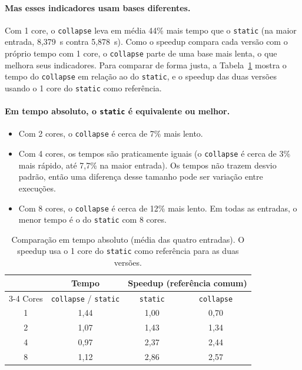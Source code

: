 \documentclass[a4paper,12pt]{article}
\begin{document}
\paragraph{Mas esses indicadores usam bases diferentes.} Com 1 core, o
\texttt{collapse} leva em média 44\% mais tempo que o \texttt{static} (na maior
entrada, 8,379~s contra 5,878~s). Como o speedup compara cada versão com o
próprio tempo com 1 core, o \texttt{collapse} parte de uma base mais lenta, o
que melhora seus indicadores. Para comparar de forma justa, a
Tabela~\ref{tab:comum} mostra o tempo do \texttt{collapse} em relação ao do
\texttt{static}, e o speedup das duas versões usando o 1 core do
\texttt{static} como referência.

\paragraph{Em tempo absoluto, o \texttt{static} é equivalente ou melhor.}
\begin{itemize}
    \item Com 2 cores, o \texttt{collapse} é cerca de 7\% mais lento.
    \item Com 4 cores, os tempos são praticamente iguais (o \texttt{collapse} é
    cerca de 3\% mais rápido, até 7,7\% na maior entrada). Os tempos não trazem
    desvio padrão, então uma diferença desse tamanho pode ser variação entre
    execuções.
    \item Com 8 cores, o \texttt{collapse} é cerca de 12\% mais lento. Em todas
    as entradas, o menor tempo é o do \texttt{static} com 8 cores.
\end{itemize}

\begin{table}[ht]
\centering
\caption{Comparação em tempo absoluto (média das quatro entradas). O speedup
usa o 1 core do \texttt{static} como referência para as duas versões.}
\label{tab:comum}
\small
\begin{tabular}{c c cc}
\toprule
 & Tempo & \multicolumn{2}{c}{Speedup (referência comum)} \\
\cmidrule(lr){3-4}
Cores & \texttt{collapse} / \texttt{static} & \texttt{static} & \texttt{collapse} \\
\midrule
1 & 1,44 & 1,00 & 0,70 \\
2 & 1,07 & 1,43 & 1,34 \\
4 & 0,97 & 2,37 & 2,44 \\
8 & 1,12 & 2,86 & 2,57 \\
\bottomrule
\end{tabular}
\end{table}
\end{document}
